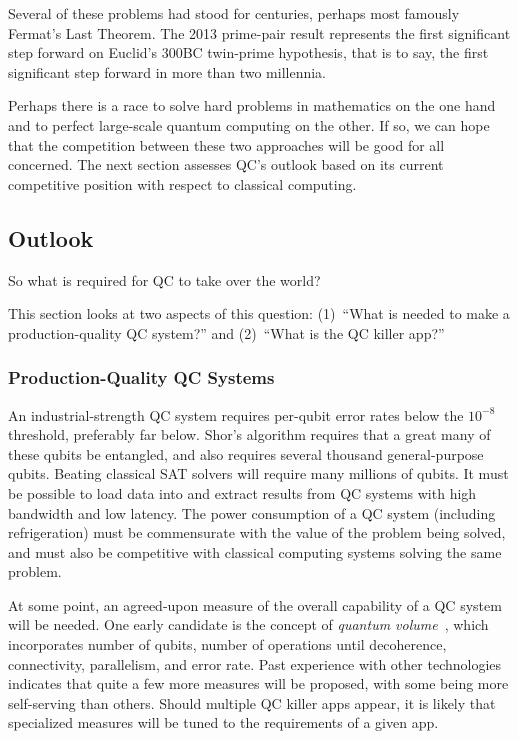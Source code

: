 Several of these problems had stood for centuries, perhaps most famously
Fermat's Last Theorem.
The 2013 prime-pair result represents the first significant step forward
on Euclid's 300BC twin-prime hypothesis, that is to say, the first
significant step forward in more than two millennia.

Perhaps there is a race to solve hard problems in mathematics on
the one hand and to perfect large-scale quantum computing on
the other.
If so, we can hope that the competition between these two approaches
will be good for all concerned.
The next section assesses QC's outlook based on its current
competitive position with respect to classical computing.

\subsection{Outlook}
\label{sec:future:Outlook}

So what is required for QC to take over the world?

This section looks at two aspects of this question:
(1)~``What is needed to make a production-quality QC system?'' and
(2)~``What is the QC killer app?''

\subsubsection{Production-Quality QC Systems}
\label{sec:future:Production-Quality QC Systems}

An industrial-strength QC system requires per-qubit error rates below the
$10^{-8}$ threshold, preferably far below.
Shor's algorithm requires that a great many of these qubits be entangled,
and also requires several thousand general-purpose qubits.
Beating classical SAT solvers will require many millions of qubits.
It must be possible to load data into and extract results from QC
systems with high bandwidth and low latency.
The power consumption of a QC system (including refrigeration) must be
commensurate with the value of the problem being solved, and must also
be competitive with classical computing systems solving the same problem.

At some point, an agreed-upon measure of the overall capability of a
QC system will be needed.
One early candidate is the concept of
\emph{quantum volume}~\cite{LevSBishop2017QuantumVolume,TaliaGershon2017QuantumVolume},
which incorporates number of qubits, number of operations until decoherence,
connectivity, parallelism, and error rate.
Past experience with other technologies indicates that quite a few more
measures will be proposed, with some being more self-serving than others.
Should multiple QC killer apps appear, it is likely that specialized
measures will be tuned to the requirements of a given app.

